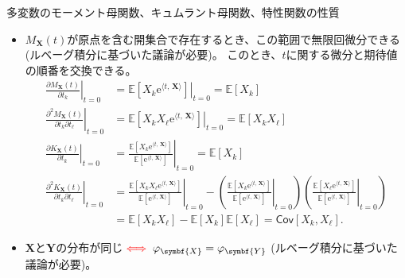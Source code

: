 \documentclass[lualatex,handout]{beamer}
\newcommand{\mycolor}[2]{%
  \begingroup
  \colorlet{currentcolor}{.}%
  \color{#1}#2%
  \color{currentcolor}%
  \endgroup
}
\newcommand{\emm}[1]{\mycolor{red}{#1}}
\newcommand{\expt}[1]{\mathbb{E}\left[#1\right]}
\newcommand{\cov}[1]{\mathsf{Cov}\left[#1\right]}
\theoremstyle{definition}
\begin{document}
\begin{frame}{多変数のモーメント母関数、キュムラント母関数、特性関数の性質}
\small
\begin{itemize}
\setlength{\itemsep}{1em}
\item $M_{\symbf{X}}(t)$が原点を含む開集合で存在するとき、この範囲で無限回微分できる(ルベーグ積分に基づいた議論が必要)。
このとき、$t$に関する微分と期待値の順番を交換できる。
\begin{align*}
\left.\frac{\partial M_{\symbf{X}}(t)}{\partial t_k}\right|_{t=0} &= \left.\expt{X_k\mathrm{e}^{\langle t,\, {\symbf{X}}\rangle}}\right|_{t=0} = \expt{X_k}\\
\left.\frac{\partial^2 M_{\symbf{X}}(t)}{\partial t_k\partial t_\ell}\right|_{t=0} &= \left.\expt{X_kX_\ell\mathrm{e}^{\langle t,\, {\symbf{X}}\rangle}}\right|_{t=0} = \expt{X_kX_\ell}\\
\left.\frac{\partial K_{\symbf{X}}(t)}{\partial t_k}\right|_{t=0} &= \left.\frac{\expt{X_k\mathrm{e}^{\langle t,\, {\symbf{X}}\rangle}}}{\expt{\mathrm{e}^{\langle t,\, {\symbf{X}}\rangle}}}\right|_{t=0} = \expt{X_k}\\
\left.\frac{\partial^2 K_{\symbf{X}}(t)}{\partial t_k\partial t_\ell}\right|_{t=0} &= \left.\frac{\expt{X_kX_\ell\mathrm{e}^{\langle t,\, {\symbf{X}}\rangle}}}{\expt{\mathrm{e}^{\langle t,\, {\symbf{X}}\rangle}}}\right|_{t=0} - \left(\left.\frac{\expt{X_k\mathrm{e}^{\langle t,\, {\symbf{X}}\rangle}}}{\expt{\mathrm{e}^{\langle t,\, {\symbf{X}}\rangle}}}\right|_{t=0}\right)\left(\left.\frac{\expt{X_\ell\mathrm{e}^{\langle t,\, {\symbf{X}}\rangle}}}{\expt{\mathrm{e}^{\langle t,\, {\symbf{X}}\rangle}}}\right|_{t=0}\right)\\
&= \expt{X_kX_\ell} - \expt{X_k}\expt{X_\ell} = \cov{X_k, X_\ell}.
\end{align*}
\item ${\symbf{X}}$と$\symbf{Y}$の分布が同じ$\emm{\iff}\varphi_{\symbf{X}}=\varphi_{\symbf{Y}}$ (ルベーグ積分に基づいた議論が必要)。
\end{itemize}


\vspace{1em}
\end{frame}
\end{document}
